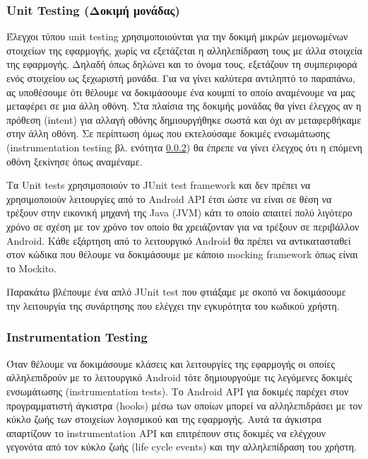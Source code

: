 		\subsubsection{Unit Testing (Δοκιμή μονάδας)}
		Έλεγχοι τύπου unit testing χρησιμοποιούνται για την δοκιμή μικρών μεμονωμένων στοιχείων της εφαρμογής, χωρίς να εξετάζεται η αλληλεπίδραση τους με άλλα στοιχεία της εφαρμογής. Δηλαδή όπως δηλώνει και το όνομα τους, εξετάζουν τη συμπεριφορά ενός στοιχείου ως ξεχωριστή μονάδα. Για να γίνει καλύτερα αντιληπτό το παραπάνω, ας υποθέσουμε ότι θέλουμε να δοκιμάσουμε ένα κουμπί το οποίο αναμένουμε να μας μεταφέρει σε μια άλλη οθόνη.  Στα πλαίσια της δοκιμής μονάδας θα γίνει έλεγχος αν η πρόθεση (intent) για αλλαγή οθόνης δημιουργήθηκε σωστά και όχι αν μεταφερθήκαμε στην άλλη οθόνη. Σε περίπτωση όμως που εκτελούσαμε δοκιμές ενσωμάτωσης (instrumentation testing βλ. ενότητα \ref{sssec:instrumentation_testing}) θα έπρεπε να γίνει έλεγχος ότι η επόμενη οθόνη ξεκίνησε όπως αναμέναμε.
		
		Τα Unit tests χρησιμοποιούν το JUnit test framework και δεν πρέπει να χρησιμοποιούν λειτουργίες από το Android API έτσι ώστε να είναι σε θέση να τρέξουν στην εικονική μηχανή της Java (JVM) κάτι το οποίο απαιτεί πολύ λιγότερο χρόνο σε σχέση με τον χρόνο τον οποίο θα χρειάζονταν για να τρέξουν σε περιβάλλον Android. Κάθε εξάρτηση από το λειτουργικό Android θα πρέπει να αντικατασταθεί στον κώδικα που θέλουμε να δοκιμάσουμε με κάποιο mocking framework όπως είναι το Mockito. 
		
		Παρακάτω βλέπουμε ένα απλό JUnit test που φτιάξαμε με σκοπό να δοκιμάσουμε την λειτουργία της συνάρτησης που ελέγχει την εγκυρότητα του κωδικού χρήστη.
		
		  

		\subsubsection{Instrumentation Testing}\label{sssec:instrumentation_testing}

		Όταν θέλουμε να δοκιμάσουμε κλάσεις και λειτουργίες της εφαρμογής οι οποίες αλληλεπιδρούν με το λειτουργικό Android τότε δημιουργούμε τις λεγόμενες δοκιμές ενσωμάτωσης (instrumentation tests). Το Android API για δοκιμές παρέχει στον προγραμματιστή άγκιστρα (hooks) μέσω των οποίων μπορεί να αλληλεπιδράσει με τον κύκλο ζωής των στοιχείων λογισμικού και της εφαρμογής. Αυτά τα άγκιστρα απαρτίζουν το instrumentation API και επιτρέπουν στις δοκιμές να ελέγχουν γεγονότα από τον κύκλο ζωής (life cycle events) και την αλληλεπίδραση του χρήστη.

